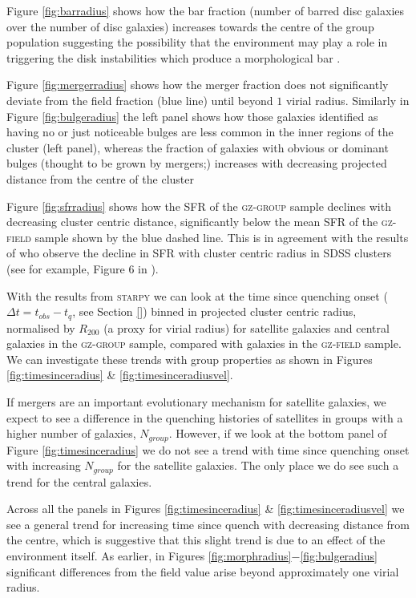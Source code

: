 \documentclass[useAMS,usenatbib]{mn2e}
\def\starpy ~{\textsc{starpy}}
\begin{document}
Figure \ref{fig:barradius} shows how the bar fraction (number of barred disc galaxies over the number of disc galaxies) increases towards the centre of the group population suggesting the possibility that the environment may play a role in triggering the disk instabilities which produce a morphological bar \citep{ref, ref, ref}. 

Figure \ref{fig:mergerradius} shows how the merger fraction does not significantly deviate from the field fraction (blue line) until beyond $1$ virial radius. Similarly in Figure \ref{fig:bulgeradius} the left panel shows how those galaxies identified as having no or just noticeable bulges are less common in the inner regions of the cluster (left panel), whereas the fraction of galaxies with obvious or dominant bulges (thought to be grown by mergers;\citealt{ref, ref, ref}) increases with decreasing projected distance from the centre of the cluster 

Figure \ref{fig:sfrradius} shows how the SFR of the \textsc{gz-group} sample declines with decreasing cluster centric distance, significantly below the mean SFR of the \textsc{gz-field} sample shown by the blue dashed line. This is in agreement with the results of \cite{gomez03} who observe the decline in SFR with cluster centric radius in SDSS clusters (see for example, Figure 6 in \citealt{gomez03}). 

With the results from \starpy~ we can look at the time since quenching onset ($\Delta t = t_{obs} - t_{q}$, see Section \ref{}) binned in projected cluster centric radius, normalised by $R_{200}$ (a proxy for virial radius) for satellite galaxies and central galaxies in the \textsc{gz-group} sample, compared with galaxies in the \textsc{gz-field} sample. We can investigate these trends with group properties as shown in Figures \ref{fig:timesinceradius} \& \ref{fig:timesinceradiusvel}. 

If mergers are an important evolutionary mechanism for satellite galaxies, we expect to see a difference in the quenching histories of satellites in groups with a higher number of galaxies, $N_{group}$. However, if we look at the bottom panel of Figure \ref{fig:timesinceradius} we do not see a trend with time since quenching onset with increasing $N_{group}$ for the satellite galaxies. The only place we do see such a trend for the central galaxies. 

Across all the panels in Figures \ref{fig:timesinceradius} \& \ref{fig:timesinceradiusvel} we see a general trend for increasing time since quench with decreasing distance from the centre, which is suggestive that this slight trend is due to an effect of the environment itself. As earlier, in Figures \ref{fig:morphradius}$-$\ref{fig:bulgeradius} significant differences from the field value arise beyond approximately one virial radius. 
\end{document}
